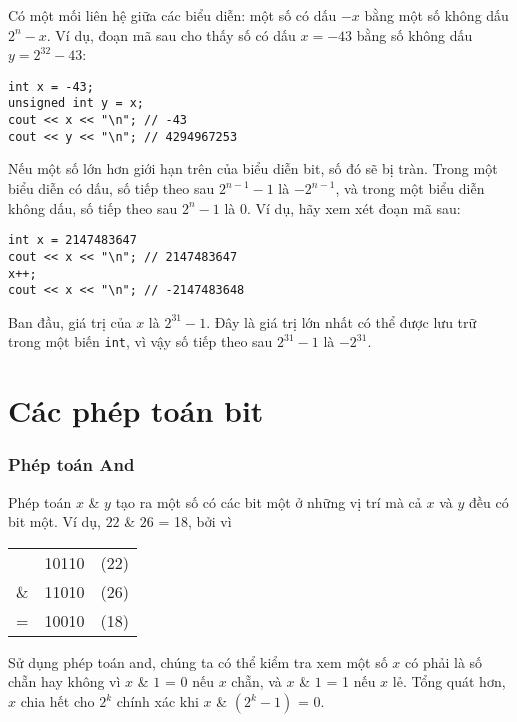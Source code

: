 Có một mối liên hệ giữa các
biểu diễn:
một số có dấu $-x$ bằng một số không dấu $2^n-x$.
Ví dụ, đoạn mã sau cho thấy
số có dấu $x=-43$ bằng số không dấu
$y=2^{32}-43$:
\begin{lstlisting}
int x = -43;
unsigned int y = x;
cout << x << "\n"; // -43
cout << y << "\n"; // 4294967253
\end{lstlisting}

Nếu một số lớn hơn giới hạn trên
của biểu diễn bit, số đó sẽ bị tràn.
Trong một biểu diễn có dấu,
số tiếp theo sau $2^{n-1}-1$ là $-2^{n-1}$,
và trong một biểu diễn không dấu,
số tiếp theo sau $2^n-1$ là $0$.
Ví dụ, hãy xem xét đoạn mã sau:
\begin{lstlisting}
int x = 2147483647
cout << x << "\n"; // 2147483647
x++;
cout << x << "\n"; // -2147483648
\end{lstlisting}

Ban đầu, giá trị của $x$ là $2^{31}-1$.
Đây là giá trị lớn nhất có thể được lưu trữ
trong một biến \texttt{int},
vì vậy số tiếp theo sau $2^{31}-1$ là $-2^{31}$.


\section{Các phép toán bit}

\newcommand\XOR{\mathbin{\char`\^}}

\subsubsection{Phép toán And}


Phép toán  $x$ \& $y$ tạo ra một số
có các bit một ở những vị trí mà cả
$x$ và $y$ đều có bit một.
Ví dụ, $22$ \& $26$ = 18, bởi vì

\begin{center}
\begin{tabular}{rrr}
& 10110 & (22)\\
\& & 11010 & (26) \\
\hline
 = & 10010 & (18) \\
\end{tabular}
\end{center}

Sử dụng phép toán and, chúng ta có thể kiểm tra xem một số
$x$ có phải là số chẵn hay không vì
$x$ \& $1$ = 0 nếu $x$ chẵn, và
$x$ \& $1$ = 1 nếu $x$ lẻ.
Tổng quát hơn, $x$ chia hết cho $2^k$
chính xác khi $x$ \& $(2^k-1)$ = 0.

